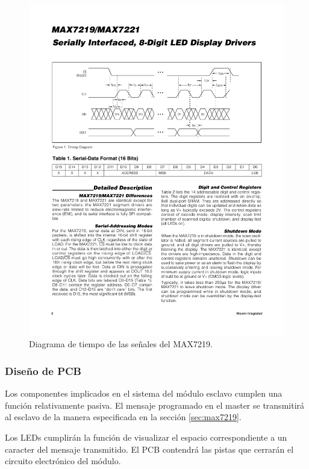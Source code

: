 \begin{figure}[ht!]
	\centering
	\begin{center}
		\includegraphics[width=\textwidth]{imagenes/hw/timingDiagram.pdf}
		\caption{Diagrama de tiempo de las señales del MAX7219.}
		\label{fig:spi-timing-diagram}
	\end{center}
\end{figure}

\subsubsection{Diseño de PCB}
Los componentes implicados en el sistema del módulo esclavo cumplen una función relativamente pasiva. El mensaje programado en el master se transmitirá al esclavo de la manera especificada en la sección \ref{sec:max7219}.

Los LEDs cumplirán la función de visualizar el espacio correspondiente a un caracter del mensaje transmitido. El PCB contendrá las pistas que cerrarán el circuito electrónico del módulo.

